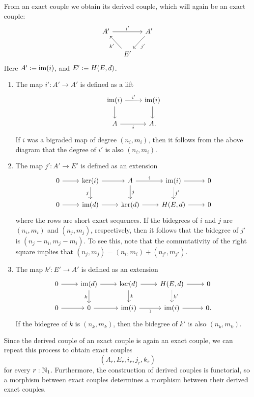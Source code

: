 \documentclass[reqno]{amsart}
\begin{document}
From an exact couple we obtain its derived couple, which will again be an exact couple:
\begin{equation*}
\begin{tikzcd}[column sep=small]
A' \arrow[rr,"{i'}"] & & A' \arrow[dl,"{j'}"] \\
& E' \arrow[ul,"{k'}"]
\end{tikzcd}
\end{equation*}
Here $A'\vcentcolon\equiv\operatorname{im}(i)$, and $E'\vcentcolon\equiv H(E,d)$. 
\begin{enumerate}
\item The map $i':A'\to A'$ is defined as a lift
\begin{equation*}
\begin{tikzcd}
\im(i) \arrow[r,densely dotted,"{i'}"] \arrow[d] & \im(i) \arrow[d] \\
A \arrow[r,swap,"i"] & A.
\end{tikzcd}
\end{equation*}
If $i$ was a bigraded map of degree $(n_i,m_i)$, then it follows from the above
diagram that the degree of $i'$ is also $(n_i,m_i)$.
\item The map $j':A'\to E'$ is defined as an extension
\begin{equation*}
\begin{tikzcd}
0 \arrow[r] & \ker(i) \arrow[r] \arrow[d,swap,"j"] & A \arrow[r,"i"] \arrow[d,"j"] & \im(i) \arrow[r] \arrow[d,densely dotted,"{j'}"] & 0 \\
0 \arrow[r] & \im(d) \arrow[r] & \ker(d) \arrow[r] & H(E,d) \arrow[r] & 0
\end{tikzcd}
\end{equation*}
where the rows are short exact sequences. If the bidegrees of $i$ and $j$ are
$(n_i,m_i)$ and $(n_j,m_j)$, respectively, then it follows that the bidegree of
$j'$ is $(n_j-n_i,m_j-m_i)$. To see this, note that the commutativity of the
right square implies that $(n_j,m_j)=(n_i,m_i)+(n_{j'},m_{j'})$. 
\item The map $k':E'\to A'$ is defined as an extension
\begin{equation*}
\begin{tikzcd}
0 \arrow[r] & \im(d) \arrow[r] \arrow[d,swap,"k"] & \ker(d) \arrow[r] \arrow[d,"k"] & H(E,d) \arrow[r] \arrow[d,densely dotted,"{k'}"] & 0 \\
0 \arrow[r] & 0 \arrow[r] & \im(i) \arrow[r,swap,"1"] & \im(i) \arrow[r] & 0.
\end{tikzcd}
\end{equation*}
If the bidegree of $k$ is $(n_k,m_k)$, then the bidegree of $k'$ is also $(n_k,m_k)$.
\end{enumerate}
Since the derived couple of an exact couple is again an exact couple, we can repeat this process to obtain exact
couples 
\begin{equation*}
(A_r,E_r,i_r,j_r,k_r)
\end{equation*}
for every $r:\mathbb{N}_1$. Furthermore, the construction of derived couples is functorial,
so a morphism between exact couples determines a morphism between their derived
exact couples.
\end{document}
